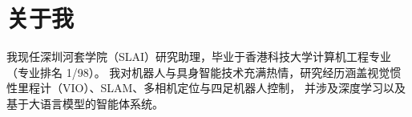\vspace{-\acvSectionTopSkip}

\section{关于我}
\vspace{\acvSectionContentTopSkip}

{\fontsize{9.2pt}{1.5em}\bodyfontlight\upshape\color{text}\justify
我现任深圳河套学院（SLAI）研究助理，毕业于香港科技大学计算机工程专业（专业排名 1/98）。
我对机器人与具身智能技术充满热情，研究经历涵盖视觉惯性里程计（VIO）、SLAM、多相机定位与四足机器人控制，
并涉及深度学习以及基于大语言模型的智能体系统。\par}

\vspace{\acvSectionContentTopSkip}
